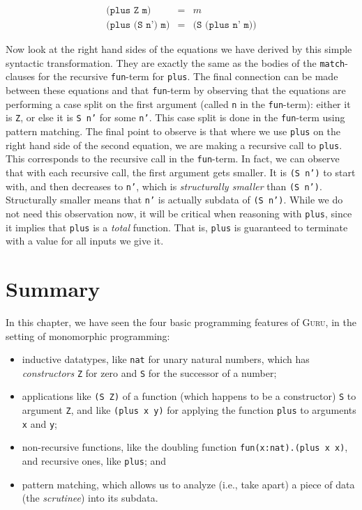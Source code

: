 \documentclass{book}[12pt]
\newcommand{\guru}[0]{\textsc{Guru}\xspace}
\begin{document}
\begin{eqnarray*}
\texttt{(plus Z m)} & = & m \\
\texttt{(plus (S n') m)} & = & \texttt{(S (plus n' m))}
\end{eqnarray*}

\noindent Now look at the right hand sides of the equations we have
derived by this simple syntactic transformation.  They are exactly the
same as the bodies of the \texttt{match}-clauses for the recursive
\texttt{fun}-term for \texttt{plus}.  The final connection can be made
between these equations and that \texttt{fun}-term by observing that
the equations are performing a case split on the first argument
(called \texttt{n} in the \texttt{fun}-term): either it is \texttt{Z},
or else it is \texttt{S n'} for some \texttt{n'}.  This case split is
done in the \texttt{fun}-term using pattern matching.  The final point
to observe is that where we use \texttt{plus} on the right hand side
of the second equation, we are making a recursive call to
\texttt{plus}.  This corresponds to the recursive call in the
\texttt{fun}-term.  In fact, we can observe that with each recursive
call, the first argument gets smaller.  It is \texttt{(S n')} to start
with, and then decreases to \texttt{n'}, which is \emph{structurally
smaller} than \texttt{(S n')}.  Structurally smaller means that
\texttt{n'} is actually subdata of \texttt{(S n')}.  While we do not
need this observation now, it will be critical when reasoning with
\texttt{plus}, since it implies that \texttt{plus} is a \emph{total}
function.  That is, \texttt{plus} is guaranteed to terminate with a
value for all inputs we give it.

\section{Summary}

In this chapter, we have seen the four basic programming features of
\guru, in the setting of monomorphic programming:
\begin{itemize}
\item inductive datatypes, like \texttt{nat} for unary natural
numbers, which has \emph{constructors} \texttt{Z} for zero and
\texttt{S} for the successor of a number;
\item applications like \texttt{(S Z)} of a function (which happens to be a constructor) \texttt{S} to argument \texttt{Z},
and like \texttt{(plus x y)} for applying the function \texttt{plus} to arguments \texttt{x} and \texttt{y};
\item non-recursive functions, like the doubling function \texttt{fun(x:nat).(plus x x)}, and recursive ones, like \texttt{plus}; and
\item pattern matching, which allows us to analyze (i.e., take apart)
a piece of data (the \emph{scrutinee}) into its subdata.
\end{itemize}
\end{document}
